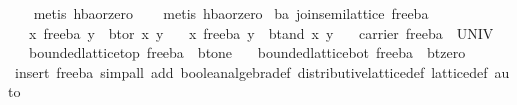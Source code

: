 \begin{isabellebody}
\ \ \isamarkupfalse%
\ {}metis\ hba{}or{}zero{}\isanewline
\ \ \isamarkupfalse%
\ {}metis\ hba{}or{}zero{}%
\endisatagproof
{\isafoldproof}%
%
\isadelimproof
\isanewline
%
\endisadelimproof
\isanewline
{}\isamarkupfalse%
\ ba{}\ join{}semilattice\ free{}ba\isanewline
\ \ \ {}x\ {}\isactrlbsub free{}ba\isactrlesub \ y\ {}\ bt{}or\ x\ y{}\isanewline
\ \ \ {}x\ {}\isactrlbsub free{}ba\isactrlesub \ y\ {}\ bt{}and\ x\ y{}\isanewline
\ \ \ {}carrier\ free{}ba\ {}\ UNIV{}\isanewline
\ \ \ {}bounded{}lattice{}top\ free{}ba\ {}\ bt{}one{}\isanewline
\ \ \ {}bounded{}lattice{}bot\ free{}ba\ {}\ bt{}zero{}\isanewline
%
\isadelimproof
\ \ %
\endisadelimproof
%
\isatagproof
{}\isamarkupfalse%
\ {}insert\ free{}ba{}\ simp{}all\ add{}\ boolean{}algebra{}def\ distributive{}lattice{}def\ lattice{}def{}\ auto{}%

\end{isabellebody}
